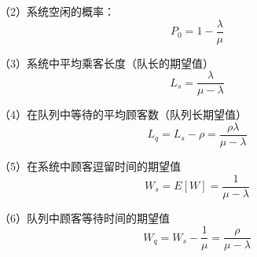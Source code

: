 （2）系统空闲的概率：
\begin{equation}
    P_0 = 1-\frac{\lambda}{\mu}
\end{equation}

（3）系统中平均乘客长度（队长的期望值）
\begin{equation}
    L_s = \frac{\lambda}{\mu - \lambda}
\end{equation}

（4）在队列中等待的平均顾客数（队列长期望值）
\begin{equation}
    L_q = L_s - \rho = \frac{\rho \lambda}{\mu - \lambda}
\end{equation}

（5）在系统中顾客逗留时间的期望值
\begin{equation}
    W_s = E[W] = \frac{1}{\mu - \lambda}
\end{equation}

（6）队列中顾客等待时间的期望值
\begin{equation}\label{fomula36}
    W_q = W_s - \frac{1}{\mu} = \frac{\rho}{\mu - \lambda}
\end{equation}








